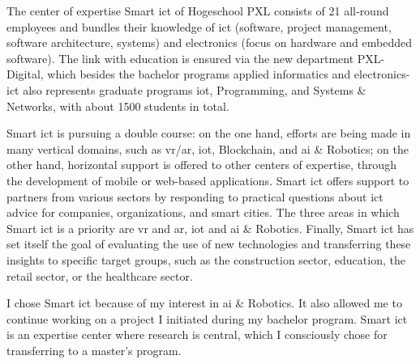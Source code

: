 The center of expertise Smart \acs{ict} of Hogeschool PXL consists of 21 all\hyp{}round employees and bundles their knowledge of \acs{ict} (software, project management, software architecture, systems) and electronics (focus on hardware and embedded software). The link with education is ensured via the new department PXL\hyp{}Digital, which besides the bachelor programs applied informatics and electronics\hyp{}\acs{ict} also represents graduate programs \acl{iot}, Programming, and Systems \& Networks, with about 1500 students in total.

Smart \acs{ict} is pursuing a double course: on the one hand, efforts are being made in many vertical domains, such as \acs{vr}/\acs{ar}, \ac{iot}, Blockchain, and \acl{ai} \& Robotics; on the other hand, horizontal support is offered to other centers of expertise, through the development of mobile or web\hyp{}based applications. Smart \acs{ict} offers support to partners from various sectors by responding to practical questions about \acs{ict} advice for companies, organizations, and smart cities. The three areas in which Smart \acs{ict} is a priority are \acs{vr} and \acs{ar}, \acl{iot} and \acl{ai} \& Robotics. Finally, Smart \acs{ict} has set itself the goal of evaluating the use of new technologies and transferring these insights to specific target groups, such as the construction sector, education, the retail sector, or the healthcare sector.

I chose Smart \acs{ict} because of my interest in \acl{ai} \& Robotics. It also allowed me to continue working on a project I initiated during my bachelor program. Smart \acs{ict} is an expertise center where research is central, which I consciously chose for transferring to a master's program.